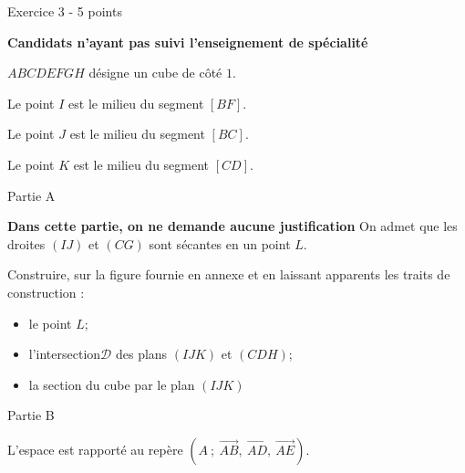 
%
\begin{h2}Exercice 3 - 5 points\end{h2}
\textbf{Candidats n'ayant pas suivi l'enseignement de spécialité}

\begin{center}
\end{center}

$ABCDEFGH$ désigne un cube de côté $1$.
\par
Le point $I$ est le milieu du segment $[BF]$.
\par
Le point $J$ est le milieu du segment $[BC]$.
\par
Le point $K$ est le milieu du segment $[CD]$.
\begin{h3}Partie A\end{h3}
\textbf{Dans cette partie, on ne demande aucune justification}
On admet que les droites $(IJ)$ et $(CG)$ sont sécantes en un point $L$.
\par
Construire, sur la figure fournie en annexe et en laissant apparents les traits de construction :
\begin{itemize}
     \item
     le point $L$;
     \item
     l'intersection$\mathscr{D}$ des plans $(IJK)$ et $(CDH)$;
     \item
     la section du cube par le plan $(IJK)$
\end{itemize}
\begin{h3}Partie B\end{h3}
L'espace est rapporté au repère $\left(A ~;~\overrightarrow{AB},~\overrightarrow{AD},~\overrightarrow{AE}\right)$.
